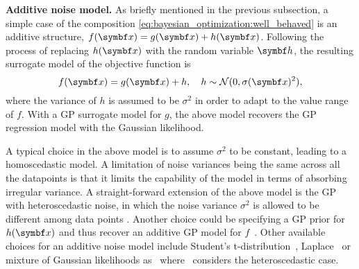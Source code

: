 \textbf{Additive noise model.}
As briefly mentioned in the previous subsection, a simple case of the composition \cref{eq:bayesian_optimization:well_behaved} is an additive structure, $f(\mat{x}) = g(\mat{x})+h(\mat{x})$.
Following the process of replacing $h(\mat{x})$ with the random variable $\mat{h}$, the resulting surrogate model of the objective function is
\begin{equation}
    f(\mat{x}) = g(\mat{x}) + h, \quad h \sim \mathcal{N}(0, \sigma(\mat{x})^2),
\end{equation}
where the variance of $h$ is assumed to be $\sigma^2$ in order to adapt to the value range of $f$.
With a GP surrogate model for $g$, the above model recovers the GP regression model with the Gaussian likelihood.

A typical choice in the above model is to assume $\sigma^2$ to be constant, leading to a homoscedastic model.
A limitation of noise variances being the same across all the datapoints is that it limits the capability of the model in terms of absorbing irregular variance.
A straight-forward extension of the above model is the GP with heteroscedastic noise, in which the noise variance $\sigma^2$ is allowed to be different among data points \parencite{goldberg_regression_1998,lazaro-gredilla_variational_2011}.
Another choice could be specifying a GP prior for $h(\mat{x})$ and thus recover an additive GP model for $f$~\parencite{bernardo_regression_1998,duvenaud_additive_2011}.
Other available choices for an additive noise model include Student's t-distribution~\parencite{jylanki_robust_2011}, Laplace~\parencite{kuss_gaussian_2006} or
mixture of Gaussian likelihoods as~\parencite{kuss_gaussian_2006, stegle_gaussian_2008, naish-guzman_robust_2008} where~\parencite{naish-guzman_robust_2008} considers the heteroscedastic case.

